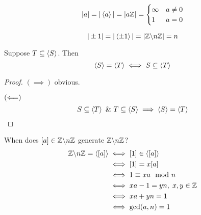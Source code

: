 \documentclass[12pt]{article}
\begin{document}
\bboxexam
\begin{exam}[Integers]\
  \[
    |a|=|\left\langle a\right\rangle|=|a\mathbb Z|=
    \begin{cases}
      \infty&a\neq0\\
      1&a=0
    \end{cases}
  \]
\end{exam}
\ebox

\bboxexam
\begin{exam}
  \[
    |\pm1|=|\left\langle \pm1\right\rangle|
    =|\mathbb Z\backslash n\mathbb Z|=n
  \]
\end{exam}
\ebox

\bboxlem
\begin{lem}
  Suppose \(T\subseteq\left\langle S\right\rangle\). Then
  \[\left\langle S\right\rangle=\left\langle T\right\rangle\iff S\subseteq\left\langle T\right\rangle\]
\end{lem}
\ebox

\bboxproof
\begin{proof}[Proof]
  \((\implies)\) obvious.

  \((\Longleftarrow)\)
  \[S\subseteq\gen{T}\ \&\ T\subseteq\gen{S}\implies\gen{S}=\gen{T}\]
\end{proof}
\ebox


\bboxexam
\begin{exam}
  When does \([a]\in\mathbb Z\backslash n\mathbb Z\) generate \(\mathbb Z\backslash n\mathbb Z\)?
  \begin{align*}
    \mathbb Z\backslash n\mathbb Z=\left\langle [a]\right\rangle&\iff[1]\in\left\langle [a]\right\rangle\\
                              &\iff[1]=x[a]\\
                              &\iff1\equiv xa\mod n\\
                              &\iff xa-1=yn,\;x,y\in\mathbb Z\\
                              &\iff xa+yn=1\\
                              &\iff\gcd(a,n)=1
  \end{align*}
\end{exam}
\ebox

\end{document}
